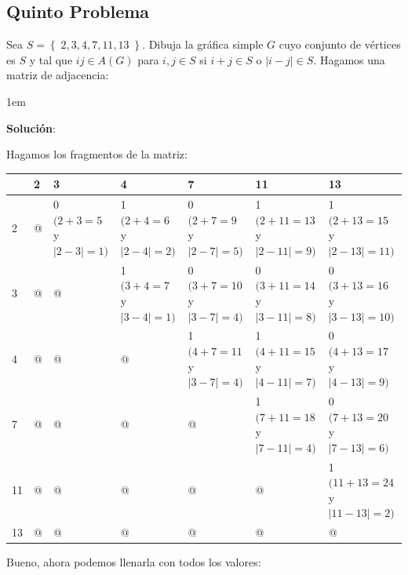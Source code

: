 \documentclass[journal,12pt,onecolumn]{IEEEtran}                %
\newenvironment{SmallIndentation}[1][0.75em]                    %
        {\begin{adjustwidth}{#1}{}\begin{footnotesize}}             %
        {\end{footnotesize}\end{adjustwidth}}                       %
\theoremstyle{break}                                            %
\newcommand{\Set}[1]            {\left\{ \; #1 \; \right\}}     %
\begin{document}
    \clearpage
    \begin{landscape}
        \section*{Quinto Problema}

        Sea $S = \Set{2, 3, 4, 7, 11, 13}$. Dibuja la gráfica simple $G$ cuyo 
        conjunto de vértices es $S$ y tal que $ij \in A(G)$ para $i, j \in S$ si 
        $i + j \in S$ o $|i - j| \in S$.
        Hagamos una matriz de adjacencia:

        \begin{SmallIndentation}[1em]
            \textbf{Solución}:

            Hagamos los fragmentos de la matriz:

            \begin{tabular}{|l|l|l|l|l|l|l|}
                \hline
                    & 2 & 3                         & 4                         & 7                         & 11                           & 13 \\ \hline
                2   & @ & 0 $(2+3=5$ y $|2-3|=1)$   & 1 $(2+4=6$ y $|2-4|=2)$   & 0 $(2+7=9$ y $|2-7|=5)$   & 1 $(2+11=13$ y $|2-11|=9)$   & 1 $(2+13=15$ y $|2-13|=11)$ \\ \hline
                3   & @ & @                         & 1 $(3+4=7$ y $|3-4|=1)$   & 0 $(3+7=10$ y $|3-7|=4)$  & 0 $(3+11=14$ y $|3-11|=8)$   & 0 $(3+13=16$ y $|3-13|=10)$ \\ \hline
                4   & @ & @                         & @                         & 1 $(4+7=11$ y $|3-7|=4)$  & 1 $(4+11=15$ y $|4-11|=7)$   & 0 $(4+13=17$ y $|4-13|=9)$  \\ \hline
                7   & @ & @                         & @                         & @                         & 1 $(7+11=18$ y $|7-11|=4)$   & 0 $(7+13=20$ y $|7-13|=6)$  \\ \hline
                11  & @ & @                         & @                         & @                         & @                            & 1 $(11+13=24$ y $|11-13|=2)$\\ \hline
                13  & @ & @ & @ & @ & @ & @ \\ \hline
            \end{tabular}
            

            Bueno, ahora podemos llenarla con todos los valores:


\end{SmallIndentation}
\end{landscape}
\end{document}
